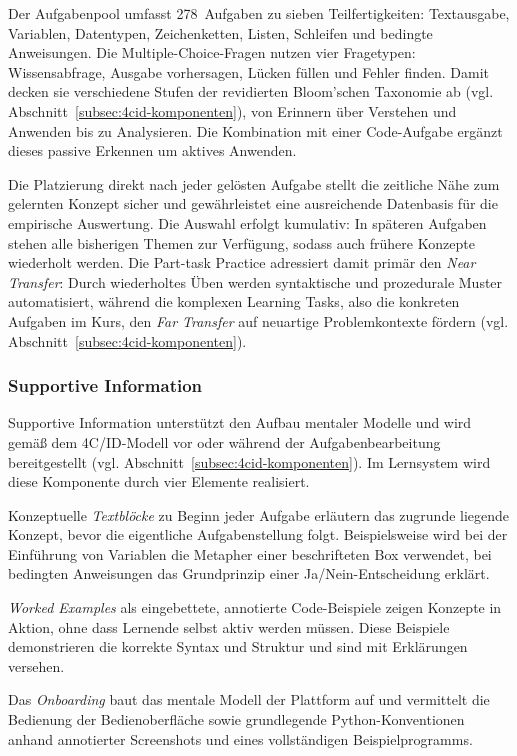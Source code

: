 Der Aufgabenpool umfasst 278~Aufgaben zu sieben Teilfertigkeiten: Textausgabe, Variablen, Datentypen, Zeichenketten, Listen, Schleifen und bedingte Anweisungen.
Die Multiple-Choice-Fragen nutzen vier Fragetypen: Wissensabfrage, Ausgabe vorhersagen, Lücken füllen und Fehler finden. Damit decken sie verschiedene Stufen der revidierten Bloom'schen Taxonomie ab (vgl. Abschnitt~\ref{subsec:4cid-komponenten}), von Erinnern über Verstehen und Anwenden bis zu Analysieren.
Die Kombination mit einer Code-Aufgabe ergänzt dieses passive Erkennen um aktives Anwenden.

Die Platzierung direkt nach jeder gelösten Aufgabe stellt die zeitliche Nähe zum gelernten Konzept sicher und gewährleistet eine ausreichende Datenbasis für die empirische Auswertung.
Die Auswahl erfolgt kumulativ: In späteren Aufgaben stehen alle bisherigen Themen zur Verfügung, sodass auch frühere Konzepte wiederholt werden.
Die Part-task Practice adressiert damit primär den \textit{Near Transfer}: Durch wiederholtes Üben werden syntaktische und prozedurale Muster automatisiert, während die komplexen Learning Tasks, also die konkreten Aufgaben im Kurs, den \textit{Far Transfer} auf neuartige Problemkontexte fördern (vgl. Abschnitt~\ref{subsec:4cid-komponenten}).

\subsubsection{Supportive Information}

Supportive Information unterstützt den Aufbau mentaler Modelle und wird gemäß dem 4C/ID-Modell vor oder während der Aufgabenbearbeitung bereitgestellt (vgl. Abschnitt~\ref{subsec:4cid-komponenten}).
Im Lernsystem wird diese Komponente durch vier Elemente realisiert.

Konzeptuelle \textit{Textblöcke} zu Beginn jeder Aufgabe erläutern das zugrunde liegende Konzept, bevor die eigentliche Aufgabenstellung folgt.
Beispielsweise wird bei der Einführung von Variablen die Metapher einer beschrifteten Box verwendet, bei bedingten Anweisungen das Grundprinzip einer Ja/Nein-Entscheidung erklärt.

\textit{Worked Examples} als eingebettete, annotierte Code-Beispiele zeigen Konzepte in Aktion, ohne dass Lernende selbst aktiv werden müssen.
Diese Beispiele demonstrieren die korrekte Syntax und Struktur und sind mit Erklärungen versehen.

Das \textit{Onboarding} baut das mentale Modell der Plattform auf und vermittelt die Bedienung der Bedienoberfläche sowie grundlegende Python-Konventionen anhand annotierter Screenshots und eines vollständigen Beispielprogramms.

